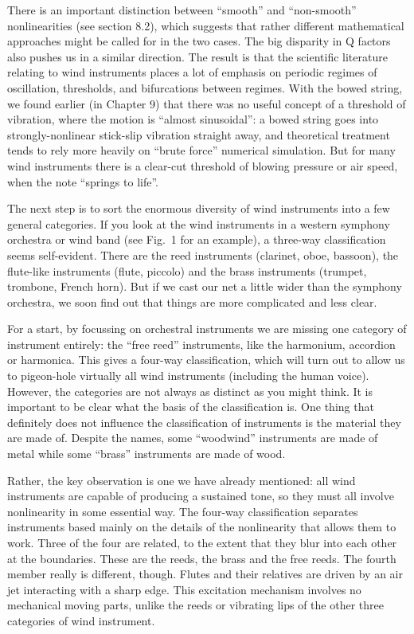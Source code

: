   There is an important distinction between “smooth” and “non-smooth” 
  nonlinearities (see section 8.2), which suggests that rather different 
  mathematical approaches might be called for in the two cases. The big 
  disparity in Q factors also pushes us in a similar direction. The result is 
  that the scientific literature relating to wind instruments places a lot of 
  emphasis on periodic regimes of oscillation, thresholds, and bifurcations 
  between regimes. With the bowed string, we found earlier (in Chapter 9) that 
  there was no useful concept of a threshold of vibration, where the motion is 
  “almost sinusoidal”: a bowed string goes into strongly-nonlinear stick-slip 
  vibration straight away, and theoretical treatment tends to rely more heavily 
  on ``brute force'' numerical simulation. But for many wind instruments there 
  is a clear-cut threshold of blowing pressure or air speed, when the note 
  ``springs to life''. 


  The next step is to sort the enormous diversity of wind instruments into a 
  few general categories. If you look at the wind instruments in a western 
  symphony orchestra or wind band (see Fig.\ 1 for an example), a three-way 
  classification seems self-evident. There are the reed instruments (clarinet, 
  oboe, bassoon), the flute-like instruments (flute, piccolo) and the brass 
  instruments (trumpet, trombone, French horn). But if we cast our net a little 
  wider than the symphony orchestra, we soon find out that things are more 
  complicated and less clear. 

  For a start, by focussing on orchestral instruments we are missing one 
  category of instrument entirely: the “free reed” instruments, like the 
  harmonium, accordion or harmonica. This gives a four-way classification, 
  which will turn out to allow us to pigeon-hole virtually all wind instruments 
  (including the human voice). However, the categories are not always as 
  distinct as you might think. It is important to be clear what the basis of 
  the classification is. One thing that definitely does not influence the 
  classification of instruments is the material they are made of. Despite the 
  names, some “woodwind” instruments are made of metal while some “brass” 
  instruments are made of wood. 

  Rather, the key observation is one we have already mentioned: all wind 
  instruments are capable of producing a sustained tone, so they must all 
  involve nonlinearity in some essential way. The four-way classification 
  separates instruments based mainly on the details of the nonlinearity that 
  allows them to work. Three of the four are related, to the extent that they 
  blur into each other at the boundaries. These are the reeds, the brass and 
  the free reeds. The fourth member really is different, though. Flutes and 
  their relatives are driven by an air jet interacting with a sharp edge. This 
  excitation mechanism involves no mechanical moving parts, unlike the reeds or 
  vibrating lips of the other three categories of wind instrument. 

